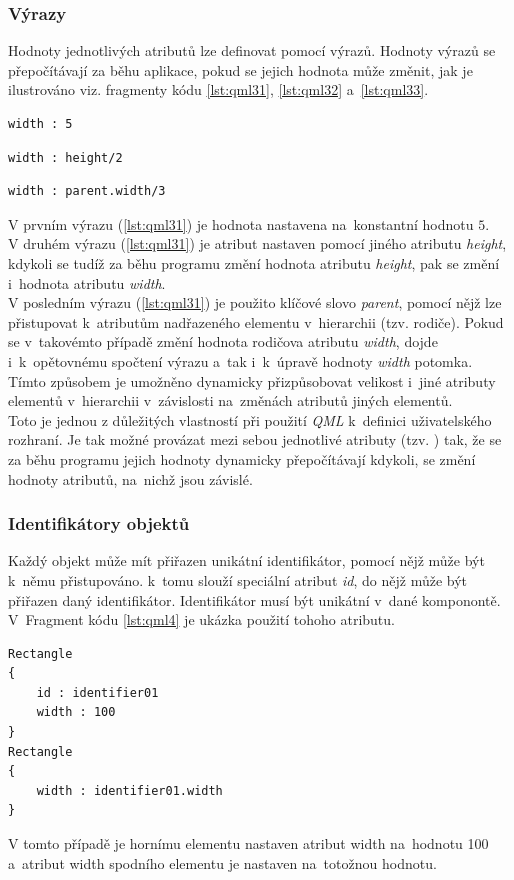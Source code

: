 \documentclass[11pt,twoside,a4paper]{book}
\begin{document}
\subsubsection{Výrazy}
Hodnoty jednotlivých atributů lze definovat pomocí výrazů. Hodnoty výrazů se přepočítávají za běhu aplikace, pokud se jejich hodnota může změnit, jak je ilustrováno viz. fragmenty kódu \ref{lst:qml31}, \ref{lst:qml32} a~\ref{lst:qml33}.
\begin{lstlisting}[frame=single,caption=Výraz ilustrující přiřazení konstanty.,label=lst:qml31]
	width : 5
\end{lstlisting}
\begin{lstlisting}[frame=single,caption=Výraz ilustrující přiřazení hodnoty jiného atributu.,label=lst:qml32]
	width : height/2
\end{lstlisting}
\begin{lstlisting}[frame=single,caption=Výraz ilustrující přiřazení hodnoty atributu jiného elementu.,label=lst:qml33]
	width : parent.width/3
\end{lstlisting}
V prvním výrazu (\ref{lst:qml31}) je hodnota nastavena na~konstantní hodnotu $5$.\\
V druhém výrazu (\ref{lst:qml31}) je atribut nastaven pomocí jiného atributu \textit{height}, kdykoli se tudíž za běhu programu změní hodnota atributu \textit{height}, pak se změní i~hodnota atributu \textit{width}.\\
V posledním výrazu (\ref{lst:qml31}) je použito klíčové slovo \textit{parent}, pomocí nějž lze přistupovat k~atributům nadřazeného elementu v~hierarchii (tzv. rodiče). Pokud se v~takovémto případě změní hodnota rodičova atributu \textit{width}, dojde i~k~opětovnému spočtení výrazu a~tak i~k~úpravě hodnoty \textit{width} potomka. Tímto způsobem je umožněno dynamicky přizpůsobovat velikost i~jiné atributy elementů v~hierarchii v~závislosti na~změnách atributů jiných elementů.\\
Toto je jednou z důležitých vlastností při použití \textit{QML} k~definici uživatelského rozhraní. Je tak možné provázat mezi sebou jednotlivé atributy (tzv. ) tak, že se za běhu programu jejich hodnoty dynamicky přepočítávají kdykoli, se změní hodnoty atributů, na~nichž jsou závislé.

\subsubsection{Identifikátory objektů}
Každý objekt může mít přiřazen unikátní identifikátor, pomocí nějž může být k~němu přistupováno.  k~tomu slouží speciální atribut \textit{id}, do nějž může být přiřazen daný identifikátor. Identifikátor musí být unikátní v~dané komponontě. V~Fragment kódu \ref{lst:qml4} je ukázka použití tohoho atributu.
\begin{lstlisting}[frame=single,caption=Ukázka použití atributu id.,label=lst:qml4]
Rectangle
{
	id : identifier01
	width : 100
}
Rectangle
{
	width : identifier01.width
}
\end{lstlisting}
V tomto případě je hornímu elementu nastaven atribut width na~hodnotu 100 a~atribut width spodního elementu je nastaven na~totožnou hodnotu.
\end{document}
